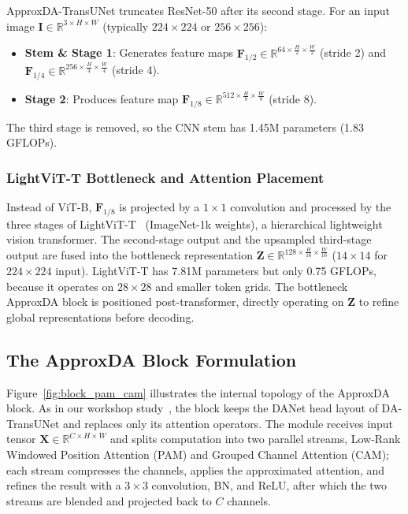 ApproxDA-TransUNet truncates ResNet-50 after its second stage. For an input image $\mathbf{I} \in \mathbb{R}^{3 \times H \times W}$ (typically $224 \times 224$ or $256 \times 256$):
\begin{itemize}
    \item \textbf{Stem \& Stage 1}: Generates feature maps $\mathbf{F}_{1/2} \in \mathbb{R}^{64 \times \frac{H}{2} \times \frac{W}{2}}$ (stride 2) and $\mathbf{F}_{1/4} \in \mathbb{R}^{256 \times \frac{H}{4} \times \frac{W}{4}}$ (stride 4).
    \item \textbf{Stage 2}: Produces feature map $\mathbf{F}_{1/8} \in \mathbb{R}^{512 \times \frac{H}{8} \times \frac{W}{8}}$ (stride 8).
\end{itemize}
The third stage is removed, so the CNN stem has 1.45M parameters (1.83 GFLOPs).

\subsubsection{LightViT-T Bottleneck and Attention Placement}
Instead of ViT-B, $\mathbf{F}_{1/8}$ is projected by a $1\times1$ convolution and processed by the three stages of LightViT-T~\cite{huang2022lightvit} (ImageNet-1k weights), a hierarchical lightweight vision transformer. The second-stage output and the upsampled third-stage output are fused into the bottleneck representation $\mathbf{Z} \in \mathbb{R}^{128 \times \frac{H}{16} \times \frac{W}{16}}$ ($14 \times 14$ for $224\times224$ input). LightViT-T has 7.81M parameters but only 0.75 GFLOPs, because it operates on $28\times28$ and smaller token grids. The bottleneck ApproxDA block is positioned post-transformer, directly operating on $\mathbf{Z}$ to refine global representations before decoding.

\subsection{The ApproxDA Block Formulation}
Figure~\ref{fig:block_pam_cam} illustrates the internal topology of the ApproxDA block. As in our workshop study~\cite{zhong2026approxda}, the block keeps the DANet head layout of DA-TransUNet and replaces only its attention operators. The module receives input tensor $\mathbf{X} \in \mathbb{R}^{C \times H \times W}$ and splits computation into two parallel streams, Low-Rank Windowed Position Attention (PAM) and Grouped Channel Attention (CAM); each stream compresses the channels, applies the approximated attention, and refines the result with a $3\times3$ convolution, BN, and ReLU, after which the two streams are blended and projected back to $C$ channels.

